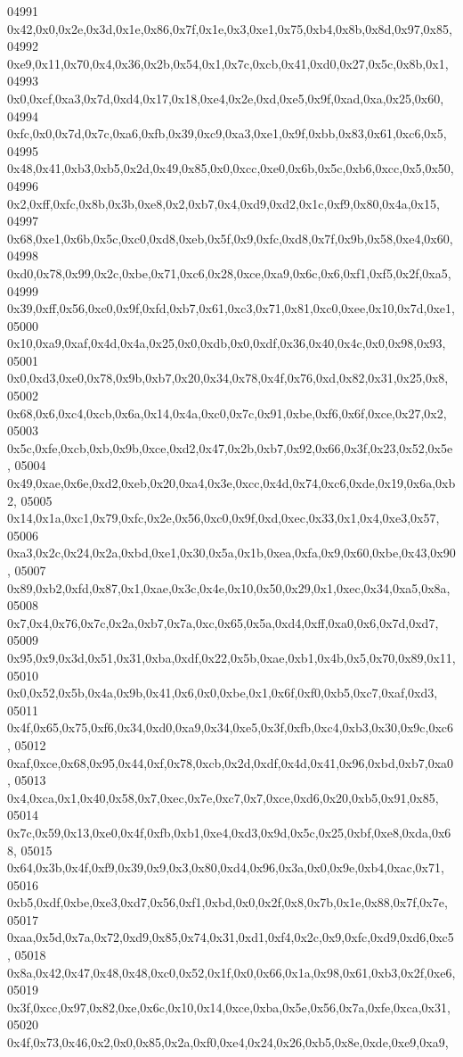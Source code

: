 \begin{DoxyCode}
04991   0x42,0x0,0x2e,0x3d,0x1e,0x86,0x7f,0x1e,0x3,0xe1,0x75,0xb4,0x8b,0x8d,0x97,0x85,
04992   0xe9,0x11,0x70,0x4,0x36,0x2b,0x54,0x1,0x7c,0xcb,0x41,0xd0,0x27,0x5c,0x8b,0x1,
04993   0x0,0xcf,0xa3,0x7d,0xd4,0x17,0x18,0xe4,0x2e,0xd,0xe5,0x9f,0xad,0xa,0x25,0x60,
04994   0xfc,0x0,0x7d,0x7c,0xa6,0xfb,0x39,0xc9,0xa3,0xe1,0x9f,0xbb,0x83,0x61,0xc6,0x5,
04995   0x48,0x41,0xb3,0xb5,0x2d,0x49,0x85,0x0,0xcc,0xe0,0x6b,0x5c,0xb6,0xcc,0x5,0x50,
04996   0x2,0xff,0xfc,0x8b,0x3b,0xe8,0x2,0xb7,0x4,0xd9,0xd2,0x1c,0xf9,0x80,0x4a,0x15,
04997   0x68,0xe1,0x6b,0x5c,0xc0,0xd8,0xeb,0x5f,0x9,0xfc,0xd8,0x7f,0x9b,0x58,0xe4,0x60,
04998   0xd0,0x78,0x99,0x2c,0xbe,0x71,0xc6,0x28,0xce,0xa9,0x6c,0x6,0xf1,0xf5,0x2f,0xa5,
04999   0x39,0xff,0x56,0xc0,0x9f,0xfd,0xb7,0x61,0xc3,0x71,0x81,0xc0,0xee,0x10,0x7d,0xe1,
05000   0x10,0xa9,0xaf,0x4d,0x4a,0x25,0x0,0xdb,0x0,0xdf,0x36,0x40,0x4c,0x0,0x98,0x93,
05001   0x0,0xd3,0xe0,0x78,0x9b,0xb7,0x20,0x34,0x78,0x4f,0x76,0xd,0x82,0x31,0x25,0x8,
05002   0x68,0x6,0xc4,0xcb,0x6a,0x14,0x4a,0xc0,0x7c,0x91,0xbe,0xf6,0x6f,0xce,0x27,0x2,
05003   0x5c,0xfe,0xcb,0xb,0x9b,0xce,0xd2,0x47,0x2b,0xb7,0x92,0x66,0x3f,0x23,0x52,0x5e,
05004   0x49,0xae,0x6e,0xd2,0xeb,0x20,0xa4,0x3e,0xcc,0x4d,0x74,0xc6,0xde,0x19,0x6a,0xb2,
05005   0x14,0x1a,0xc1,0x79,0xfc,0x2e,0x56,0xc0,0x9f,0xd,0xec,0x33,0x1,0x4,0xe3,0x57,
05006   0xa3,0x2c,0x24,0x2a,0xbd,0xe1,0x30,0x5a,0x1b,0xea,0xfa,0x9,0x60,0xbe,0x43,0x90,
05007   0x89,0xb2,0xfd,0x87,0x1,0xae,0x3c,0x4e,0x10,0x50,0x29,0x1,0xec,0x34,0xa5,0x8a,
05008   0x7,0x4,0x76,0x7c,0x2a,0xb7,0x7a,0xc,0x65,0x5a,0xd4,0xff,0xa0,0x6,0x7d,0xd7,
05009   0x95,0x9,0x3d,0x51,0x31,0xba,0xdf,0x22,0x5b,0xae,0xb1,0x4b,0x5,0x70,0x89,0x11,
05010   0x0,0x52,0x5b,0x4a,0x9b,0x41,0x6,0x0,0xbe,0x1,0x6f,0xf0,0xb5,0xc7,0xaf,0xd3,
05011   0x4f,0x65,0x75,0xf6,0x34,0xd0,0xa9,0x34,0xe5,0x3f,0xfb,0xc4,0xb3,0x30,0x9c,0xc6,
05012   0xaf,0xce,0x68,0x95,0x44,0xf,0x78,0xcb,0x2d,0xdf,0x4d,0x41,0x96,0xbd,0xb7,0xa0,
05013   0x4,0xca,0x1,0x40,0x58,0x7,0xec,0x7e,0xc7,0x7,0xce,0xd6,0x20,0xb5,0x91,0x85,
05014   0x7c,0x59,0x13,0xe0,0x4f,0xfb,0xb1,0xe4,0xd3,0x9d,0x5c,0x25,0xbf,0xe8,0xda,0x68,
05015   0x64,0x3b,0x4f,0xf9,0x39,0x9,0x3,0x80,0xd4,0x96,0x3a,0x0,0x9e,0xb4,0xac,0x71,
05016   0xb5,0xdf,0xbe,0xe3,0xd7,0x56,0xf1,0xbd,0x0,0x2f,0x8,0x7b,0x1e,0x88,0x7f,0x7e,
05017   0xaa,0x5d,0x7a,0x72,0xd9,0x85,0x74,0x31,0xd1,0xf4,0x2c,0x9,0xfc,0xd9,0xd6,0xc5,
05018   0x8a,0x42,0x47,0x48,0x48,0xc0,0x52,0x1f,0x0,0x66,0x1a,0x98,0x61,0xb3,0x2f,0xe6,
05019   0x3f,0xcc,0x97,0x82,0xe,0x6c,0x10,0x14,0xce,0xba,0x5e,0x56,0x7a,0xfe,0xca,0x31,
05020   0x4f,0x73,0x46,0x2,0x0,0x85,0x2a,0xf0,0xe4,0x24,0x26,0xb5,0x8e,0xde,0xe9,0xa9,

\end{DoxyCode}
